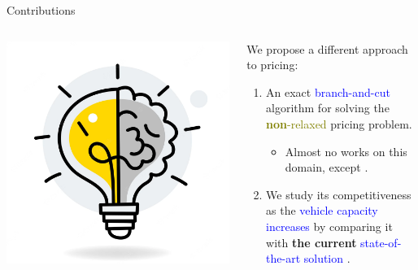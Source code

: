 \begin{frame}{Contributions}
	\begin{columns}
		\begin{column}{0.3\textwidth}
			\centering
			\includegraphics[width=\textwidth]{./Imgs/idea.png}
		\end{column}
		\begin{column}{0.7\textwidth}
			We propose a different approach to pricing:
			\begin{enumerate}
				\item An exact \textcolor{blue}{branch-and-cut} algorithm for solving the \textcolor{olive}{\textbf{non}-relaxed} pricing problem.
				      \begin{itemize}
					      \item Almost no works on this domain, except \parencite{jepsen2014}.
				      \end{itemize}
				\item We study its competitiveness as the \textcolor{blue}{vehicle capacity increases} by comparing it with \textbf{the current} \textcolor{blue}{state-of-the-art solution} \cite{pessoa2020generic}.
			\end{enumerate}
		\end{column}
	\end{columns}
\end{frame}

